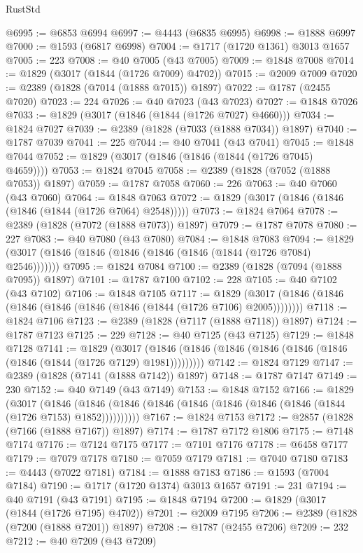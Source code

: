 \begin{lexlean}{RustStd}
\begin{coremodule}
@6995 := @6853 @6994
@6997 := @4443 (@6835 @6995)
@6998 := @1888 @6997
@7000 := @1593 (@6817 @6998)
@7004 := @1717 (@1720 @1361) @3013 @1657
@7005 := 223
@7008 := @40 @7005 (@43 @7005)
@7009 := @1848 @7008
@7014 := @1829 (@3017 (@1844 (@1726 @7009) @4702))
@7015 := @2009 @7009
@7020 := @2389 (@1828 (@7014 (@1888 @7015)) @1897)
@7022 := @1787 (@2455 @7020)
@7023 := 224
@7026 := @40 @7023 (@43 @7023)
@7027 := @1848 @7026
@7033 := @1829 (@3017 (@1846 (@1844 (@1726 @7027) @4660)))
@7034 := @1824 @7027
@7039 := @2389 (@1828 (@7033 (@1888 @7034)) @1897)
@7040 := @1787 @7039
@7041 := 225
@7044 := @40 @7041 (@43 @7041)
@7045 := @1848 @7044
@7052 := @1829 (@3017 (@1846 (@1846 (@1844 (@1726 @7045) @4659))))
@7053 := @1824 @7045
@7058 := @2389 (@1828 (@7052 (@1888 @7053)) @1897)
@7059 := @1787 @7058
@7060 := 226
@7063 := @40 @7060 (@43 @7060)
@7064 := @1848 @7063
@7072 := @1829 (@3017 (@1846 (@1846 (@1846 (@1844 (@1726 @7064) @2548)))))
@7073 := @1824 @7064
@7078 := @2389 (@1828 (@7072 (@1888 @7073)) @1897)
@7079 := @1787 @7078
@7080 := 227
@7083 := @40 @7080 (@43 @7080)
@7084 := @1848 @7083
@7094 := @1829 (@3017 (@1846 (@1846 (@1846 (@1846 (@1846 (@1844 (@1726 @7084) @2546)))))))
@7095 := @1824 @7084
@7100 := @2389 (@1828 (@7094 (@1888 @7095)) @1897)
@7101 := @1787 @7100
@7102 := 228
@7105 := @40 @7102 (@43 @7102)
@7106 := @1848 @7105
@7117 := @1829 (@3017 (@1846 (@1846 (@1846 (@1846 (@1846 (@1846 (@1844 (@1726 @7106) @2005))))))))
@7118 := @1824 @7106
@7123 := @2389 (@1828 (@7117 (@1888 @7118)) @1897)
@7124 := @1787 @7123
@7125 := 229
@7128 := @40 @7125 (@43 @7125)
@7129 := @1848 @7128
@7141 := @1829
    (@3017 (@1846 (@1846 (@1846 (@1846 (@1846 (@1846 (@1846 (@1844 (@1726 @7129) @1981)))))))))
@7142 := @1824 @7129
@7147 := @2389 (@1828 (@7141 (@1888 @7142)) @1897)
@7148 := @1787 @7147
@7149 := 230
@7152 := @40 @7149 (@43 @7149)
@7153 := @1848 @7152
@7166 := @1829
    (@3017
      (@1846 (@1846 (@1846 (@1846 (@1846 (@1846 (@1846 (@1846 (@1844 (@1726 @7153) @1852))))))))))
@7167 := @1824 @7153
@7172 := @2857 (@1828 (@7166 (@1888 @7167)) @1897)
@7174 := @1787 @7172 @1806
@7175 := @7148 @7174
@7176 := @7124 @7175
@7177 := @7101 @7176
@7178 := @6458 @7177
@7179 := @7079 @7178
@7180 := @7059 @7179
@7181 := @7040 @7180
@7183 := @4443 (@7022 @7181)
@7184 := @1888 @7183
@7186 := @1593 (@7004 @7184)
@7190 := @1717 (@1720 @1374) @3013 @1657
@7191 := 231
@7194 := @40 @7191 (@43 @7191)
@7195 := @1848 @7194
@7200 := @1829 (@3017 (@1844 (@1726 @7195) @4702))
@7201 := @2009 @7195
@7206 := @2389 (@1828 (@7200 (@1888 @7201)) @1897)
@7208 := @1787 (@2455 @7206)
@7209 := 232
@7212 := @40 @7209 (@43 @7209)

\end{coremodule}
\end{lexlean}
